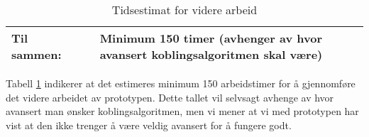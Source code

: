 \begin{table}[H]
\begin{tabular}{|p{} | p{} |p{} |}
    {\bf Til sammen:}                           & ~                                                                                                                                                                                                                 & {\bf Minimum 150 timer (avhenger av hvor avansert koblingsalgoritmen skal være)} \\ \hline
    \end{tabular}
    \caption{Tidsestimat for videre arbeid}
    \label{tab:tidsestimat}
\end{table}

Tabell \ref{tab:tidsestimat} indikerer at det estimeres minimum 150 arbeidstimer for å gjennomføre det videre arbeidet av prototypen. Dette tallet vil selvsagt avhenge av hvor avansert man ønsker koblingsalgoritmen, men vi mener at vi med prototypen har vist at den ikke trenger å være veldig avansert for å fungere godt.
